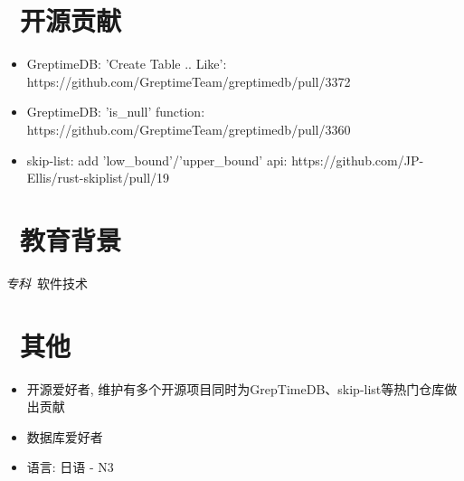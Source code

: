 \documentclass{resume}
\begin{document}

\section{\faCogs\ 开源贡献}
\begin{itemize}[parsep=0.5ex]
  \item GreptimeDB: 'Create Table .. Like': https://github.com/GreptimeTeam/greptimedb/pull/3372
  \item GreptimeDB: 'is\_null' function: https://github.com/GreptimeTeam/greptimedb/pull/3360
  \item skip-list: add 'low\_bound'/'upper\_bound' api: https://github.com/JP-Ellis/rust-skiplist/pull/19
\end{itemize}

\section{\faGraduationCap\  教育背景}
\textit{专科}\ 软件技术

\section{\faInfo\ 其他}
\begin{itemize}[parsep=0.5ex]
  \item 开源爱好者, 维护有多个开源项目同时为GrepTimeDB、skip-list等热门仓库做出贡献
  \item 数据库爱好者
  \item 语言: 日语 - N3
\end{itemize}

%
%
\end{document}
